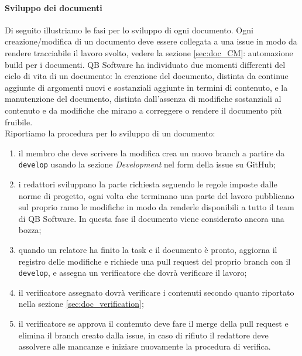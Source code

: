         \paragraph{Sviluppo dei documenti} \label{sec:doc_dev}%
            Di seguito illustriamo le fasi per lo sviluppo di ogni documento. Ogni creazione/modifica di un documento deve essere collegata a una issue in modo da rendere tracciabile il lavoro svolto, vedere la sezione \ref{sec:doc_CM}: automazione build per i documenti. QB Software ha individuato due momenti differenti del ciclo di vita di un documento: la creazione del documento, distinta da continue aggiunte di argomenti nuovi e sostanziali aggiunte in termini di contenuto, e la manutenzione del documento, distinta dall'assenza di modifiche sostanziali al contenuto e da modifiche che mirano a correggere o rendere il documento più fruibile.
            \\
            Riportiamo la procedura per lo sviluppo di un documento:
            \begin{enumerate}
                \item il membro che deve scrivere la modifica crea un nuovo branch a partire da \verb|develop| usando la sezione \emph{Development} nel form della issue su GitHub;
                \item i redattori sviluppano la parte richiesta seguendo le regole imposte dalle norme di progetto, ogni volta che terminano una parte del lavoro pubblicano sul proprio ramo le modifiche in modo da renderle disponibili a tutto il team di QB Software. In questa fase il documento viene considerato ancora una bozza;
                \item quando un relatore ha finito la task e il documento è pronto, aggiorna il registro delle modifiche e richiede una pull request del proprio branch con il \verb|develop|, e assegna un verificatore che dovrà verificare il lavoro;
                \item il verificatore assegnato dovrà verificare i contenuti secondo quanto riportato nella sezione \ref{sec:doc_verification};
                \item il verificatore se approva il contenuto deve fare il merge della pull request e elimina il branch creato dalla issue, in caso di rifiuto il redattore deve assolvere alle mancanze e iniziare nuovamente la procedura di verifica.
            \end{enumerate}

